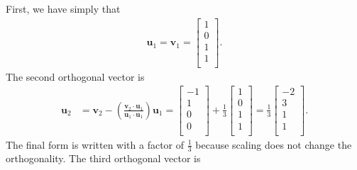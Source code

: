 First, we have simply that
\begin{align}
  \mathbf{u}_1 = \mathbf{v}_1 =  \left[ \begin{array}{c}  1 \\  0 \\  1 \\  1 \\ \end{array} \right] . 
\end{align}
The second orthogonal vector is
\begin{align}
  \mathbf{u}_2 &= \mathbf{v}_2 - \left( \frac{ \mathbf{v}_2 \cdot \mathbf{u}_1 }{ \mathbf{u}_1 \cdot \mathbf{u}_1 } \right) \mathbf{u}_1 
   = \left[ \begin{array}{c} -1 \\  1 \\  0 \\  0 \\ \end{array} \right] + \frac{1}{3} \left[ \begin{array}{c}  1 \\  0 \\  1 \\  1 \\ \end{array} \right]
   = \frac{1}{3}  \left[ \begin{array}{c} -2 \\  3 \\  1 \\  1 \\ \end{array} \right] .
\end{align}
The final form is written with a factor of $\frac{1}{3}$ because scaling does not change the orthogonality. The third orthogonal vector is
